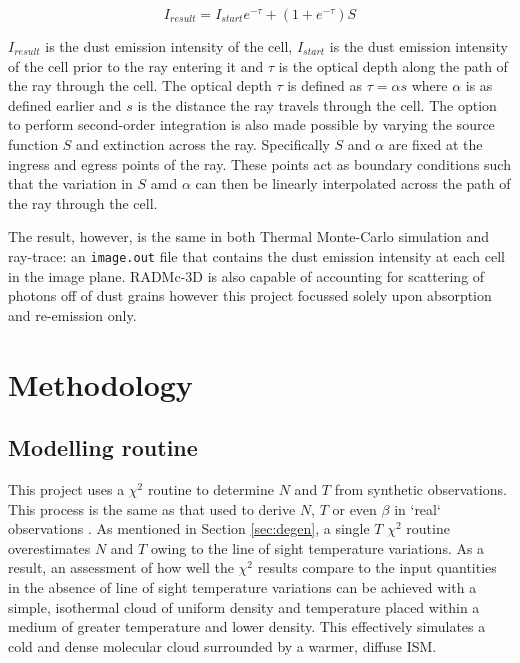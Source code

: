 \documentclass{report}
\begin{document}
\begin{equation}
  I_{result} = I_{start}e^{-\tau}+(1+e^{-\tau})S
\end{equation}\label{eq:raytrace}

$I_{result}$ is the dust emission intensity of the cell, $I_{start}$ is the dust emission intensity of the cell prior to the ray entering it and $\tau$ is the optical depth along the path of the ray through the cell. The optical depth $\tau$ is defined as $\tau = \alpha s$ where $\alpha$ is as defined earlier and $s$ is the distance the ray travels through the cell. The option to perform second-order integration is also made possible by varying the source function $S$ and extinction across the ray. Specifically $S$ and $\alpha$ are fixed at the ingress and egress points of the ray. These points act as boundary conditions such that the variation in $S$ amd $\alpha$ can then be linearly interpolated across the path of the ray through the cell.

The result, however, is the same in both Thermal Monte-Carlo simulation and ray-trace: an \texttt{image.out} file that contains the dust emission intensity at each cell in the image plane. RADMc-3D is also capable of accounting for scattering of photons off of dust grains however this project focussed solely upon absorption and re-emission only.


\chapter{Methodology}
\section{Modelling routine}
This project uses a $\chi^{2}$ routine to determine $N$ and $T$ from synthetic observations. This process is the same as that used to derive $N$, $T$ or even $\beta$ in `real` observations \parencite{noise,noiseb}. As mentioned in Section \ref{sec:degen}, a single $T$ $\chi^{2}$ routine overestimates $N$ and $T$ owing to the line of sight temperature variations. As a result, an assessment of how well the $\chi^{2}$ results compare to the input quantities in the absence of line of sight temperature variations can be achieved with a simple, isothermal cloud of uniform density and temperature placed within a medium of greater temperature and lower density. This effectively simulates a cold and dense molecular cloud surrounded by a warmer, diffuse ISM.
\end{document}
